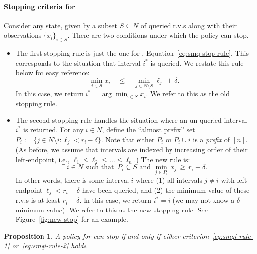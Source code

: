 \documentclass[11pt]{article}
\newtheorem{prop}[thm]{Proposition}
\theoremstyle{remark}
\theoremstyle{plain}
\theoremstyle{remark}
\begin{document}
 
\paragraph{Stopping criteria for \smqi} 
Consider any state, given by a subset $S\subseteq N$ of queried r.v.s along with their observations $\{x_i\}_{i\in S}$. There are two conditions under which the \smqi policy can stop.
\begin{itemize}
    \item The first stopping rule is just the one for \smq, Equation~\eqref{eq:smq-stop-rule}. This corresponds to the situation that interval $i^*$ is queried. We restate this rule below for easy reference:  
\begin{equation}
    \label{eq:smqi-rule-1}
 \min_{i\in S} x_i\quad \le \quad \min_{j\in N\setminus S} \ell_j \,+\, \delta.
 \end{equation}
  In this case, we return $i^*=\arg\min_{i\in S} x_i$. We refer to this as the old stopping rule.

\item The second stopping rule handles the situation where an un-queried interval $i^*$ is returned. For any $i\in N$, define the ``almost prefix'' set $P_i:=\{j \in N\setminus i : \ell_j < r_i-\delta\}$. Note that either $P_i$ or $P_i\cup i$ is  a {\em prefix} of $[n]$. (As before, we assume that  intervals are indexed by increasing order of their left-endpoint, i.e.,  $\ell_1 \leq \ell_2\leq \dots \leq  \ell_n$.)     The new rule is:
\begin{equation}
    \label{eq:smqi-rule-2}
\exists \, i\in N  \text{ such that } \,  P_i \subseteq S \text{ and } \min_{j\in P_i} \, x_j \,\ge\, r_i-\delta .
\end{equation}
In other words, there is some  interval $i$ where (1) all intervals $j\ne i$ with left-endpoint $\ell_j<r_i-\delta$ have been queried, and (2) the minimum  value of these r.v.s is at least   $r_i-\delta$. In this case, we return $i^*=i$ (we may not know a $\delta$-minimum value).  We refer to this as the new stopping rule. See Figure~\ref{fig:new-stop} for an example. 
\end{itemize}


\begin{prop}
    A policy for \smqi can stop if and only if either criterion~\eqref{eq:smqi-rule-1} or~\eqref{eq:smqi-rule-2} holds. 
\end{prop}
\end{document}
